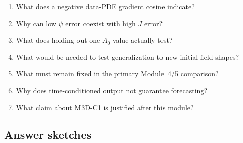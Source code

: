 \documentclass[11pt]{article}
\begin{document}
\begin{enumerate}[label=\textbf{Q\arabic*.}]
  \item What does a negative data-PDE gradient cosine indicate?
  \item Why can low $\psi$ error coexist with high $J$ error?
  \item What does holding out one $A_0$ value actually test?
  \item What would be needed to test generalization to new initial-field shapes?
  \item What must remain fixed in the primary Module~4/5 comparison?
  \item Why does time-conditioned output not guarantee forecasting?
  \item What claim about M3D-C1 is justified after this module?
\end{enumerate}

\subsection*{Answer sketches}
\end{document}

